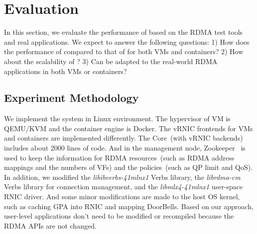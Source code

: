 \section{Evaluation} \label{eval}
In this section, we evaluate the performance of \sys based on the RDMA test tools and real applications. We expect to answer the following questions: 1) How does the performance of \sys compared to that of \native for both VMs and containers? 2) How about the scalability of \sys? 3) Can \sys be adapted to the real-world RDMA applications in both VMs or containers?
%
%

\subsection{Experiment Methodology}


We implement the \sys system in Linux environment. The hypervisor of VM is QEMU/KVM and the container engine is Docker. The vRNIC frontends for VMs and containers are implemented differently. The \sys Core~(with vRNIC backends) includes about 2000 lines of code.
And in the management node, Zookeeper~\cite{zookeeper} is used to keep the information for RDMA resources~(such as RDMA address mappings and the numbers of VFs) and the policies~(such as QP limit and QoS).
In addition, we modified the \textit{libibverbs-41mlnx1} Verbs library, the \textit{librdma-cm} Verbs library for connection management, and the \textit{libmlx4-41mlnx1} user-space RNIC driver.
And some minor modifications are made to the host OS kernel, such as caching GPA into RNIC and mapping DoorBells.
Based on our approach, user-level applications don't need to be modified or recompiled because the RDMA APIs are not changed. %

